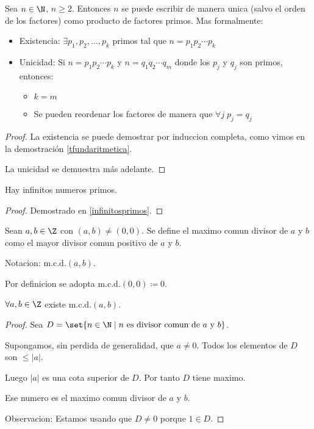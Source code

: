 \begin{theorem}
	Sea \(n \in \N \), \(n \geq  2 \). Entonces \(n \) se puede escribir de manera unica (salvo el orden de los factores) como producto de factores primos. Mas formalmente:
	\begin{itemize}
		\item Existencia: \(\exists p_1,p_2,\ldots,p_k \) primos tal que \(n = p_1 p_2 \cdots p_k \)
		\item Unicidad: Si \(n = p_1 p_2 \cdots p_k \) y \(n = q_1 q_2 \cdots q_m \) donde los \(p_j \) y \(q_j \) son primos, entonces: \begin{itemize}
			      \item \(k = m\)
			      \item Se pueden reordenar los factores de manera que \(\forall j\; p_j = q_j \)
		      \end{itemize}
	\end{itemize}
\end{theorem}

\begin{proof}
	\label{unicidadtfund}
	La existencia se puede demostrar por induccion completa, como vimos en la demostración \eqref{tfundaritmetica}.

	La unicidad se demuestra más adelante.
\end{proof}

\begin{theorem}
	Hay infinitos numeros primos.
\end{theorem}
\begin{proof}
	Demostrado en \eqref{infinitosprimos}.
\end{proof}

\begin{definition}
	Sean \(a,b \in \Z \) con \((a,b) \neq (0,0)\). Se define el maximo comun divisor de \(a \) y \(b \) como el mayor divisor comun positivo de \(a \) y \(b \).

	Notacion: \(\mathrm{m.c.d.}(a,b) \).

	Por definicion se adopta \(\mathrm{m.c.d.}(0,0) \coloneqq 0\).
\end{definition}

\begin{proposition}[Existencia m.c.d]
	\(\forall a,b \in \Z \) existe \(\mathrm{m.c.d.}(a,b) \).
\end{proposition}
\begin{proof}
	Sea \(D = \set{n \in \N \mid n \text{ es divisor comun de } a \text{ y } b }\).

	Supongamos, sin perdida de generalidad, que \(a \neq 0 \). Todos los elementos de \(D \) son \(\leq |a| \).

	Luego \(|a| \) es una cota superior de \(D \). Por tanto \(D \) tiene maximo.

	Ese numero es el maximo comun divisor de \(a \) y \(b \).

	Observacion: Estamos usando que \(D \neq 0 \) porque \(1 \in D \).
\end{proof}

